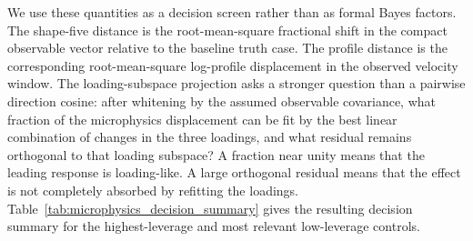 We use these quantities as a decision screen rather than as formal Bayes
factors.  The shape-five distance is the root-mean-square fractional shift in
the compact observable vector relative to the baseline truth case.  The profile
distance is the corresponding root-mean-square log-profile displacement in the
observed velocity window.  The loading-subspace projection asks a stronger
question than a pairwise direction cosine: after whitening by the assumed
observable covariance, what fraction of the microphysics displacement can be
fit by the best linear combination of changes in the three loadings, and what
residual remains orthogonal to that loading subspace?  A fraction near unity
means that the leading response is loading-like.  A large orthogonal residual
means that the effect is not completely absorbed by refitting the loadings.
Table~\ref{tab:microphysics_decision_summary} gives the resulting decision
summary for the highest-leverage and most relevant low-leverage controls.

